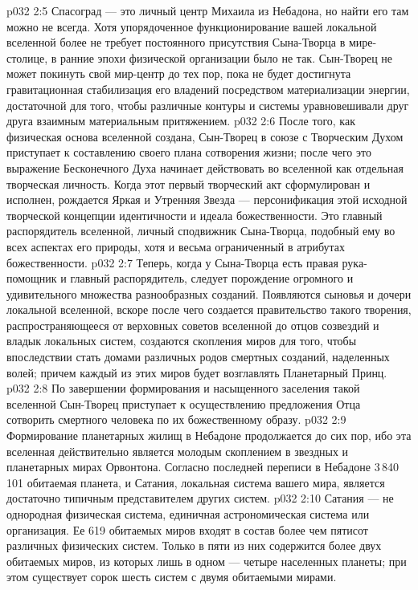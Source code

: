 \vs p032 2:5 Спасоград --- это личный центр Михаила из Небадона, но найти его там можно не всегда. Хотя упорядоченное функционирование вашей локальной вселенной более не требует постоянного присутствия Сына\hyp{}Творца в мире\hyp{}столице, в ранние эпохи физической организации было не так. Сын\hyp{}Творец не может покинуть свой мир\hyp{}центр до тех пор, пока не будет достигнута гравитационная стабилизация его владений посредством материализации энергии, достаточной для того, чтобы различные контуры и системы уравновешивали друг друга взаимным материальным притяжением.
\vs p032 2:6 \pc После того, как физическая основа вселенной создана, Сын\hyp{}Творец в союзе с Творческим Духом приступает к составлению своего плана сотворения жизни; после чего это выражение Бесконечного Духа начинает действовать во вселенной как отдельная творческая личность. Когда этот первый творческий акт сформулирован и исполнен, рождается Яркая и Утренняя Звезда --- персонификация этой исходной творческой концепции идентичности и идеала божественности. Это главный распорядитель вселенной, личный сподвижник Сына\hyp{}Творца, подобный ему во всех аспектах его природы, хотя и весьма ограниченный в атрибутах божественности.
\vs p032 2:7 Теперь, когда у Сына\hyp{}Творца есть правая рука\hyp{}помощник и главный распорядитель, следует порождение огромного и удивительного множества разнообразных созданий. Появляются сыновья и дочери локальной вселенной, вскоре после чего создается правительство такого творения, распространяющееся от верховных советов вселенной до отцов созвездий и владык локальных систем, создаются скопления миров для того, чтобы впоследствии стать домами различных родов смертных созданий, наделенных волей; причем каждый из этих миров будет возглавлять Планетарный Принц.
\vs p032 2:8 По завершении формирования и насыщенного заселения такой вселенной Сын\hyp{}Творец приступает к осуществлению предложения Отца сотворить смертного человека по их божественному образу.
\vs p032 2:9 \pc Формирование планетарных жилищ в Небадоне продолжается до сих пор, ибо эта вселенная действительно является молодым скоплением в звездных и планетарных мирах Орвонтона. Согласно последней переписи в Небадоне 3\,840\,101 обитаемая планета, и Сатания, локальная система вашего мира, является достаточно типичным представителем других систем.
\vs p032 2:10 Сатания --- не однородная физическая система, единичная астрономическая система или организация. Ее 619 обитаемых миров входят в состав более чем пятисот различных физических систем. Только в пяти из них содержится более двух обитаемых миров, из которых лишь в одном --- четыре населенных планеты; при этом существует сорок шесть систем с двумя обитаемыми мирами.
